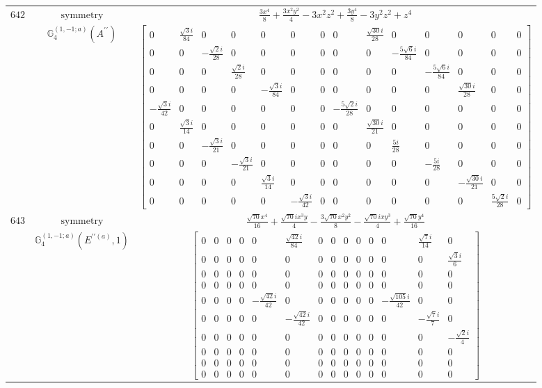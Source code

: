 \documentclass[fleqn,8pt,landscape]{jsarticle}
\begin{document}
\begin{longtable}{ccc}
$ 642 $ & $ \text{symmetry} $ & $ \frac{3 x^{4}}{8} + \frac{3 x^{2} y^{2}}{4} - 3 x^{2} z^{2} + \frac{3 y^{4}}{8} - 3 y^{2} z^{2} + z^{4} $ \\
$  $ & $ \mathbb{G}_{4}^{(1,-1;a)}(A^{\prime\prime}) $ & $ \begin{bmatrix} 0 & \frac{\sqrt{3} i}{84} & 0 & 0 & 0 & 0 & 0 & 0 & \frac{\sqrt{30} i}{28} & 0 & 0 & 0 & 0 & 0 \\ 0 & 0 & - \frac{\sqrt{2} i}{28} & 0 & 0 & 0 & 0 & 0 & 0 & - \frac{5 \sqrt{6} i}{84} & 0 & 0 & 0 & 0 \\ 0 & 0 & 0 & \frac{\sqrt{2} i}{28} & 0 & 0 & 0 & 0 & 0 & 0 & - \frac{5 \sqrt{6} i}{84} & 0 & 0 & 0 \\ 0 & 0 & 0 & 0 & - \frac{\sqrt{3} i}{84} & 0 & 0 & 0 & 0 & 0 & 0 & \frac{\sqrt{30} i}{28} & 0 & 0 \\ - \frac{\sqrt{3} i}{42} & 0 & 0 & 0 & 0 & 0 & 0 & - \frac{5 \sqrt{2} i}{28} & 0 & 0 & 0 & 0 & 0 & 0 \\ 0 & \frac{\sqrt{3} i}{14} & 0 & 0 & 0 & 0 & 0 & 0 & \frac{\sqrt{30} i}{21} & 0 & 0 & 0 & 0 & 0 \\ 0 & 0 & - \frac{\sqrt{3} i}{21} & 0 & 0 & 0 & 0 & 0 & 0 & \frac{5 i}{28} & 0 & 0 & 0 & 0 \\ 0 & 0 & 0 & - \frac{\sqrt{3} i}{21} & 0 & 0 & 0 & 0 & 0 & 0 & - \frac{5 i}{28} & 0 & 0 & 0 \\ 0 & 0 & 0 & 0 & \frac{\sqrt{3} i}{14} & 0 & 0 & 0 & 0 & 0 & 0 & - \frac{\sqrt{30} i}{21} & 0 & 0 \\ 0 & 0 & 0 & 0 & 0 & - \frac{\sqrt{3} i}{42} & 0 & 0 & 0 & 0 & 0 & 0 & \frac{5 \sqrt{2} i}{28} & 0 \end{bmatrix} $ \\ \hline
$ 643 $ & $ \text{symmetry} $ & $ \frac{\sqrt{70} x^{4}}{16} + \frac{\sqrt{70} i x^{3} y}{4} - \frac{3 \sqrt{70} x^{2} y^{2}}{8} - \frac{\sqrt{70} i x y^{3}}{4} + \frac{\sqrt{70} y^{4}}{16} $ \\
$  $ & $ \mathbb{G}_{4}^{(1,-1;a)}(E^{\prime\prime(a)},1) $ & $ \begin{bmatrix} 0 & 0 & 0 & 0 & 0 & \frac{\sqrt{42} i}{84} & 0 & 0 & 0 & 0 & 0 & 0 & \frac{\sqrt{7} i}{14} & 0 \\ 0 & 0 & 0 & 0 & 0 & 0 & 0 & 0 & 0 & 0 & 0 & 0 & 0 & \frac{\sqrt{3} i}{6} \\ 0 & 0 & 0 & 0 & 0 & 0 & 0 & 0 & 0 & 0 & 0 & 0 & 0 & 0 \\ 0 & 0 & 0 & 0 & 0 & 0 & 0 & 0 & 0 & 0 & 0 & 0 & 0 & 0 \\ 0 & 0 & 0 & 0 & - \frac{\sqrt{42} i}{42} & 0 & 0 & 0 & 0 & 0 & 0 & - \frac{\sqrt{105} i}{42} & 0 & 0 \\ 0 & 0 & 0 & 0 & 0 & - \frac{\sqrt{42} i}{42} & 0 & 0 & 0 & 0 & 0 & 0 & - \frac{\sqrt{7} i}{7} & 0 \\ 0 & 0 & 0 & 0 & 0 & 0 & 0 & 0 & 0 & 0 & 0 & 0 & 0 & - \frac{\sqrt{2} i}{4} \\ 0 & 0 & 0 & 0 & 0 & 0 & 0 & 0 & 0 & 0 & 0 & 0 & 0 & 0 \\ 0 & 0 & 0 & 0 & 0 & 0 & 0 & 0 & 0 & 0 & 0 & 0 & 0 & 0 \\ 0 & 0 & 0 & 0 & 0 & 0 & 0 & 0 & 0 & 0 & 0 & 0 & 0 & 0 \end{bmatrix} $ \\ \hline

\end{longtable}
\end{document}
